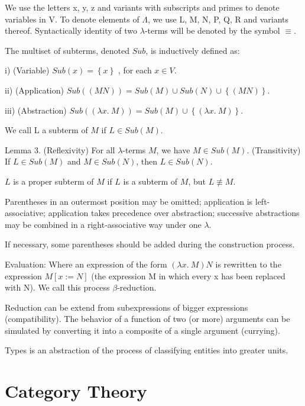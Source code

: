{\color{red}

We use the letters x, y, z and variants with subscripts and primes to denote variables in V. To denote elements of $\Lambda$, we use L, M, N, P, Q, R
and variants thereof. Syntactically identity of two $\lambda$-terms will be denoted by the symbol $\equiv$.

\begin{definition}
The multiset of subterms, denoted $Sub$, is inductively defined as:

i) (Variable) $Sub\left(x\right)=\left\{ x\right\}$ , for each $x\in V$.

ii) (Application) $Sub\left(\left(MN\right)\right)=Sub\left(M\right)\cup Sub\left(N\right)\cup\left\{ \left(MN\right)\right\}$.

iii) (Abstraction) $Sub\left(\left(\lambda x.\:M\right)\right)=Sub\left(M\right)\cup\left\{ \left(\lambda x.\:M\right)\right\}$.
\end{definition}

We call L a subterm of $M$ if $L\in Sub\left(M\right)$.

Lemma 3. (Reflexivity) For all $\lambda$-terms $M$, we have $M\in Sub\left(M\right)$.
(Transitivity) If $L\in Sub\left(M\right)$ and $M\in Sub\left(N\right)$, then $L\in Sub\left(N\right)$.

\begin{definition}
$L$ is a proper subterm of $M$ if $L$ is a subterm of $M$, but $L\not\equiv M$.
\end{definition}

Parentheses in an outermost position may be omitted; application is left-associative; application takes precedence over abstraction;
successive abstractions may be combined in a right-associative way under one $\lambda$.

}


{\color{red}

If necessary, some parentheses should be added during the construction process.

Evaluation: Where an expression of the form $\left(\lambda x.\:M\right)N$ is rewritten to the expression $M\left[x:=N\right]$ (the expression M in
which every x has been replaced with N). We call this process $\beta$-reduction.

Reduction can be extend from subexpressions of bigger expressions (compatibility). The behavior of a function of two (or more) arguments can
be simulated by converting it into a composite of a single argument (currying).

}

{\color{red}

Types is an abstraction of the process of classifying entities into greater units.

}


%
%
\section{Category Theory}



